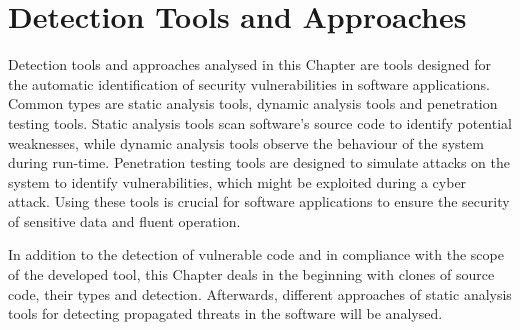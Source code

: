 
\newpage


\chapter{Detection Tools and Approaches}
\label{chapter:detection-tools}
  Detection tools and approaches analysed in this Chapter are tools designed for the automatic identification of
  security vulnerabilities in software applications. Common types are static analysis tools,
  dynamic analysis tools and penetration testing tools. Static analysis tools scan software's source code
  to identify potential weaknesses, while dynamic analysis tools observe the behaviour of the system during
  run-time. Penetration testing tools are designed to simulate attacks on the system to identify
  vulnerabilities, which might be exploited during a cyber attack. Using these tools is crucial for software
  applications to ensure the security of sensitive data and fluent operation.

  In addition to the detection of vulnerable code and in compliance with the scope of the developed tool,
  this Chapter deals in the beginning with clones of source code, their types and detection. Afterwards,
  different approaches of static analysis tools for detecting propagated threats in the software will be analysed.

